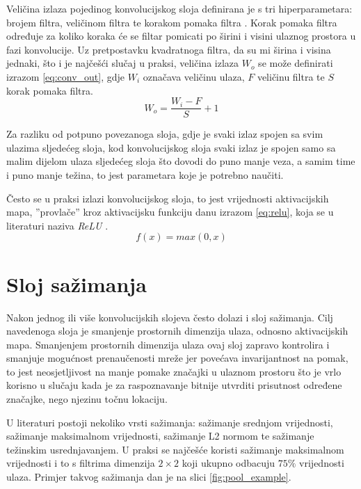 Veličina izlaza pojedinog konvolucijskog sloja definirana je s tri hiperparametara: brojem filtra, veličinom filtra te korakom pomaka filtra . Korak pomaka filtra određuje za koliko koraka će se filtar pomicati po širini i visini ulaznog prostora u fazi konvolucije. Uz pretpostavku kvadratnoga filtra, da su mi širina i visina jednaki, što i je najčešći slučaj u praksi, veličina izlaza $W_o$ se može definirati izrazom \eqref{eq:conv_out}, gdje $W_i$ označava veličinu ulaza, $F$ veličinu filtra te $S$ korak pomaka filtra.
\begin{equation} \label{eq:conv_out}
W_o = \frac{W_i - F}{S} + 1
\end{equation}

Za razliku od potpuno povezanoga sloja, gdje je svaki izlaz spojen sa svim ulazima sljedećeg sloja, kod konvolucijskog sloja svaki izlaz je spojen samo sa malim dijelom ulaza sljedećeg sloja što dovodi do puno manje veza, a samim time i puno manje težina, to jest parametara koje je potrebno naučiti.

Često se u praksi izlazi konvolucijskog sloja, to jest vrijednosti aktivacijskih mapa, ''provlače'' kroz aktivacijsku funkciju danu izrazom \eqref{eq:relu}, koja se u literaturi naziva \emph{ReLU} .
\begin{equation} \label{eq:relu}
f(x) = max(0, x)
\end{equation}

\section{Sloj sažimanja}

Nakon jednog ili više konvolucijskih slojeva često dolazi i sloj sažimanja. Cilj navedenoga sloja je smanjenje prostornih dimenzija ulaza, odnosno aktivacijskih mapa. Smanjenjem prostornih dimenzija ulaza ovaj sloj zapravo kontrolira i smanjuje mogućnost prenaučenosti mreže jer povećava invarijantnost na pomak, to jest neosjetljivost na manje pomake značajki u ulaznom prostoru što je vrlo korisno u slučaju kada je za raspoznavanje bitnije utvrditi prisutnost određene značajke, nego njezinu točnu lokaciju.

U literaturi postoji nekoliko vrsti sažimanja: sažimanje srednjom vrijednosti, sažimanje maksimalnom vrijednosti, sažimanje L2 normom te sažimanje težinskim usrednjavanjem. U praksi se najčešće koristi sažimanje maksimalnom vrijednosti i to s filtrima dimenzija $2 \times 2$ koji ukupno odbacuju $75\%$ vrijednosti ulaza. Primjer takvog sažimanja dan je na slici \ref{fig:pool_example}.

